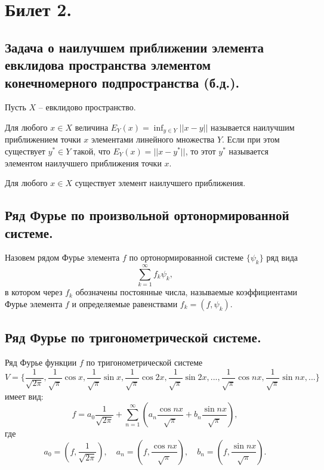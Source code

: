 \section{Билет 2.}

\subsection{Задача о наилучшем приближении элемента евклидова пространства элементом конечномерного подпространства (б.д.).}
Пусть $X$ -- евклидово пространство.
\begin{definition}
    Для любого $x \in X$ величина $E_Y(x) = \inf_{y \in Y} ||x - y||$ называется наилучшим приближением точки $x$ элементами линейного множества $Y$. Если при этом существует $y^* \in Y$ такой, что $E_Y(x) = ||x - y^*||$, то этот $y^*$ называется элементом наилучшего приближения точки $x$.
\end{definition}
\begin{theorem}
    Для любого $x \in X$ существует элемент наилучшего приближения.
\end{theorem}

\subsection{Ряд Фурье по произвольной ортонормированной системе.}
\begin{definition}
    Назовем рядом Фурье элемента $f$ по ортонормированной системе $\{\psi_k\}$ ряд вида
    \[
        \sum_{k=1}^{\infty} f_k \psi_k,
    \]
    в котором через $f_k$ обозначены постоянные числа, называемые коэффициентами Фурье элемента $f$ и определяемые равенствами $f_k = (f, \psi_k)$.
\end{definition}
\subsection{Ряд Фурье по тригонометрической системе.}
Ряд Фурье функции $f$ по тригонометрической системе $$V = \{\frac{1}{\sqrt{2\pi}}, \frac{1}{\sqrt{\pi}} \cos x, \frac{1}{\sqrt{\pi}} \sin x, \frac{1}{\sqrt{\pi}} \cos 2x, \frac{1}{\sqrt{\pi}} \sin 2x, ..., \frac{1}{\sqrt{\pi}} \cos nx, \frac{1}{\sqrt{\pi}} \sin nx, ...\}$$ имеет вид:
\[
    f = a_0\frac{1}{\sqrt{2\pi}} +  \sum_{n=1}^{\infty} \left(
        a_n \frac{\cos nx}{\sqrt{\pi}} + b_n \frac{\sin nx}{\sqrt{\pi}}
    \right),
\]
где
\[
    a_0 = \left(
        f, \frac{1}{\sqrt{2 \pi}}
    \right),
    \quad
    a_n = \left(
        f, \frac{\cos nx}{\sqrt{\pi}}
    \right),
    \quad
    b_n = \left(
        f, \frac{\sin nx}{\sqrt{\pi}}
    \right).
\]